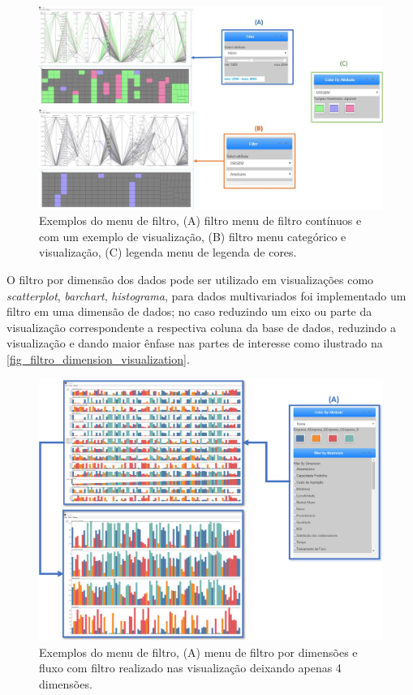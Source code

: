 \documentclass[
	12pt,				%
	openright,			%
	oneside,			%
	a4paper,			%
	english,			%
	brazil				%
	]{abntex2}
\begin{document}
\begin{itemize}
\begin{figure}
	\caption{\label{fig_filtro_visualization}  Exemplos do menu de filtro, (A) filtro menu de filtro contínuos e com um exemplo de visualização, (B) filtro menu categórico e visualização, (C) legenda menu de legenda de cores.
}
	\begin{center}
	    \includegraphics[width=40pc,scale=1]{figures/filtro.jpg}
	\end{center}
\end{figure}

O filtro por dimensão dos dados pode ser utilizado em visualizações como \textit{scatterplot}, \textit{barchart}, \textit{histograma}, para dados multivariados foi implementado um filtro em uma dimensão de dados; no caso reduzindo um eixo ou parte da visualização correspondente a respectiva coluna da base de dados, reduzindo a visualização e dando maior ênfase nas partes de interesse como ilustrado na \autoref{fig_filtro_dimension_visualization}.

\begin{figure}
	\caption{\label{fig_filtro_dimension_visualization}  Exemplos do menu de filtro, (A) menu de filtro por dimensões e fluxo com filtro realizado nas visualização deixando apenas 4 dimensões.
}
	\begin{center}
	    \includegraphics[width=40pc,scale=1]{figures/filtro_dimensao.png}
	\end{center}
\end{figure}



\end{itemize}
\end{document}
